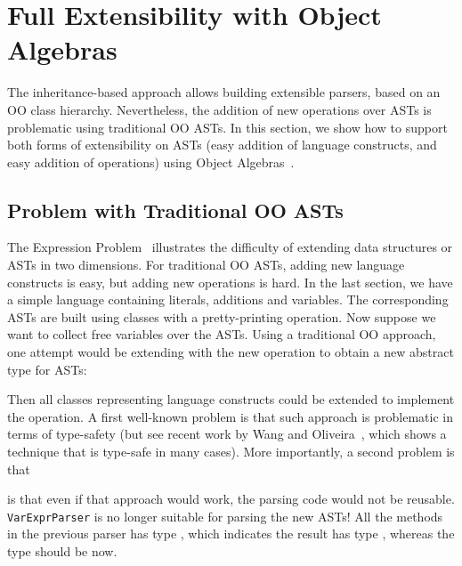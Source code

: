 \section{Full Extensibility with Object Algebras}\label{sec:algebrasandparsing}

The inheritance-based approach allows building extensible parsers, based on an OO class hierarchy.  Nevertheless, the addition of new operations over ASTs is problematic using traditional OO ASTs. In this section, we
show how to support both forms of extensibility on ASTs (easy
addition of language constructs, and easy addition of operations)
using Object Algebras~\cite{Oliveira:2012}.

\subsection{Problem with Traditional OO ASTs}\label{subsec:problemwithoutoa}

The Expression Problem~\cite{wadler1998expression} illustrates the
difficulty of extending data structures or ASTs in two dimensions. For
traditional OO ASTs, adding new language constructs is easy, but
adding new operations is hard. In the last section, we have a simple
language containing literals, additions and variables. The
corresponding ASTs are built using classes with a pretty-printing
operation. Now suppose we want to collect free variables over the
ASTs. Using a traditional OO approach, one attempt would be extending
 with the new operation to obtain a new abstract type
for ASTs:


\noindent Then all classes representing language constructs could be 
extended to implement the operation. A first well-known problem is that such
approach is problematic in terms of type-safety (but see recent work 
by Wang and Oliveira~\cite{wang2016expression}, which shows a technique that is type-safe
in many cases). More importantly, a second problem is that
\begin{comment}
But then programmers have to define a new class for each construct by
extending the old class with \lstinline{FVarsExpr}, and implementing
the corresponding \lstinline{fVars} method:


Besides introducing boilerplate code, more classes have to be defined
along with future extensions. They pollutes the namespace heavily.
More importantly, 
\end{comment}
is that even if that approach would work, the parsing code would not
be reusable. \lstinline{VarExprParser} is no longer suitable for parsing the new ASTs! All the methods in the previous parser has type , which indicates the result has type , whereas the type should be  now.

